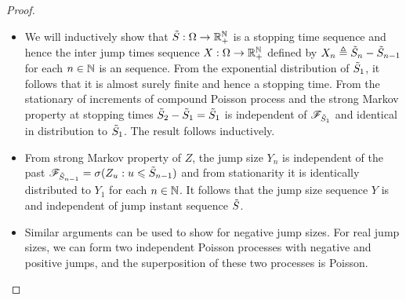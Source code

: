 \documentclass[a4paper,english,10pt]{article}
\begin{document}
\begin{proof}
\begin{itemize}
\begin{itemize}
\item[Inter jump times \iid:]
We will inductively show that $\tilde{S}:\Omega\to\mathbb{R}_+^{\mathbb{N}}$ is a stopping time sequence and hence the inter jump times sequence $X:\Omega\to\mathbb{R}_+^{\mathbb{N}}$ defined by $X_n \triangleq \tilde{S}_n-\tilde{S}_{n-1}$ for each $n\in\mathbb{N}$ is an \iid sequence. 
From the exponential distribution of $\tilde{S}_1$, it follows that it is almost surely finite and hence a stopping time. 
From the stationary of increments of compound Poisson process and the strong Markov property at stopping times $\tilde{S}_2 -\tilde{S}_1 = \tilde{S}_1$ is independent of $\mathscr{F}_{\tilde{S}_1}$ and identical in distribution to $\tilde{S}_1$. 
The result follows inductively. 

\item[Jump size \iid: ] 
From strong Markov property of $Z$, the jump size $Y_n$ is independent of the past $\mathscr{F}_{\tilde{S}_{n-1}} = \sigma(Z_u: u \leqslant \tilde{S}_{n-1})$ and from stationarity it is identically distributed to $Y_1$ for each $n \in \mathbb{N}$. 
It follows that the jump size sequence $Y$ is \iid and independent of jump instant sequence $\tilde{S}$.  
\item[Superposition:] Similar arguments can be used to show for negative jump sizes. 
For real jump sizes, we can form two independent Poisson processes with negative and positive jumps, 
and the superposition of these two processes is Poisson. 
\end{itemize}


\end{itemize}
\end{proof}
\end{document}
